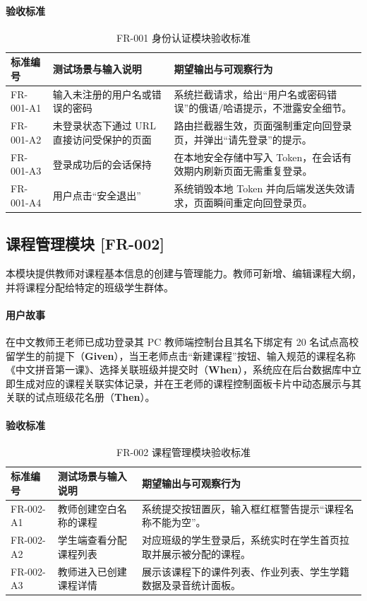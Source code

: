 \paragraph{验收标准}
\begin{table}[H]
\centering
\caption{FR-001 身份认证模块验收标准}
\begin{tabularx}{\textwidth}{l p{5.5cm} X}
\toprule
\textbf{标准编号} & \textbf{测试场景与输入说明} & \textbf{期望输出与可观察行为} \\
\midrule
FR-001-A1 & 输入未注册的用户名或错误的密码 & 系统拦截请求，给出“用户名或密码错误”的俄语/哈语提示，不泄露安全细节。 \\
FR-001-A2 & 未登录状态下通过 URL 直接访问受保护的页面 & 路由拦截器生效，页面强制重定向回登录页，并弹出“请先登录”的提示。 \\
FR-001-A3 & 登录成功后的会话保持 & 在本地安全存储中写入 Token，在会话有效期内刷新页面无需重复登录。 \\
FR-001-A4 & 用户点击“安全退出” & 系统销毁本地 Token 并向后端发送失效请求，页面瞬间重定向回登录页。 \\
\bottomrule
\end{tabularx}
\end{table}

\subsection{课程管理模块 [FR-002]}
本模块提供教师对课程基本信息的创建与管理能力。教师可新增、编辑课程大纲，并将课程分配给特定的班级学生群体。
\paragraph{用户故事}
在中文教师王老师已成功登录其 PC 教师端控制台且其名下绑定有 20 名试点高校留学生的前提下（\textbf{Given}），当王老师点击“新建课程”按钮、输入规范的课程名称《中文拼音第一课》、选择关联班级并提交时（\textbf{When}），系统应在后台数据库中立即生成对应的课程关联实体记录，并在王老师的课程控制面板卡片中动态展示与其关联的试点班级花名册（\textbf{Then}）。
\paragraph{验收标准}
\begin{table}[H]
\centering
\caption{FR-002 课程管理模块验收标准}
\begin{tabularx}{\textwidth}{l p{5.5cm} X}
\toprule
\textbf{标准编号} & \textbf{测试场景与输入说明} & \textbf{期望输出与可观察行为} \\
\midrule
FR-002-A1 & 教师创建空白名称的课程 & 系统提交按钮置灰，输入框红框警告提示“课程名称不能为空”。 \\
FR-002-A2 & 学生端查看分配课程列表 & 对应班级的学生登录后，系统实时在学生首页拉取并展示被分配的课程。 \\
FR-002-A3 & 教师进入已创建课程详情 & 展示该课程下的课件列表、作业列表、学生学籍数据及录音统计面板。 \\
\bottomrule
\end{tabularx}
\end{table}

